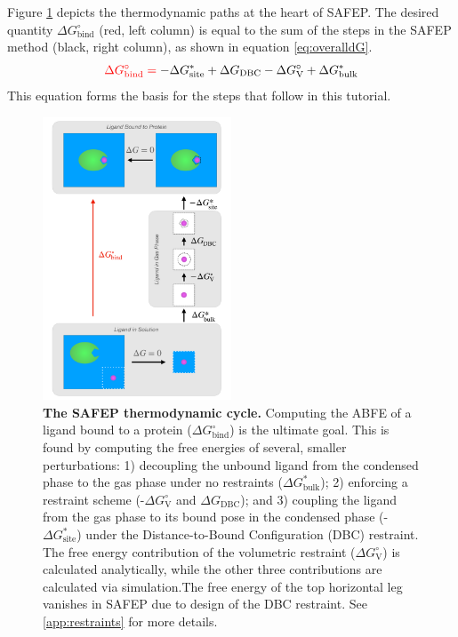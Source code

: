 \documentclass[9pt,tutorial]{Styling/livecoms}
\begin{document}
Figure \ref{fig:cycle} depicts the thermodynamic paths at the heart of SAFEP. 
The desired quantity $\Delta G^\circ_\mathrm{bind}$ (red, left column) is equal to the sum of the steps in the SAFEP method (black, right column), as shown in equation \ref{eq:overalldG}. 
\begin{equation}\label{eq:overalldG}
    \color{red} \Delta G^\circ_\mathrm{bind} = \color{black} - \Delta G_\mathrm{site}^* + \Delta G_\mathrm{DBC} - \Delta G^\circ_\mathrm{V} + \Delta G^*_\mathrm{bulk} 
\end{equation}
\noindent This equation forms the basis for the steps that follow in this tutorial. 

\begin{figure}[!ht]
    \centering
    \includegraphics[width=0.5\textwidth]{SAFEP_cycle.pdf}
    \caption{\textbf{The SAFEP thermodynamic cycle.} 
    Computing the ABFE of a ligand bound to a protein ($\Delta G^\circ_\mathrm{bind}$) is the ultimate goal. 
    This is found by computing the free energies of several, smaller perturbations: 1) decoupling the unbound ligand from the condensed phase to the gas phase under no restraints ($\Delta G^*_{\mathrm{bulk}}$); 2) enforcing a restraint scheme (-$\Delta G^\circ_\mathrm{V}$ and $\Delta G_\mathrm{DBC}$); and 3) coupling the ligand from the gas phase to its bound pose in the condensed phase (-$\Delta G^*_{\mathrm{site}}$) under the Distance-to-Bound Configuration (DBC) restraint.
    The free energy contribution of the volumetric restraint ($\Delta G^\circ_\mathrm{V}$) is calculated analytically, while the other three contributions are calculated via simulation.The free energy of the top horizontal leg vanishes in SAFEP due to design of the DBC restraint. See \ref{app:restraints} for more details.}
    \label{fig:cycle}
\end{figure}
\end{document}
